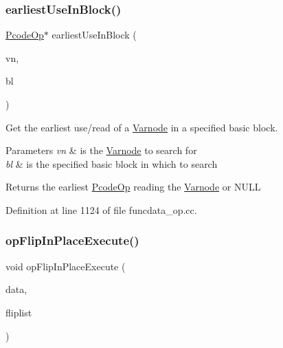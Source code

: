 \subsubsection{\texorpdfstring{earliestUseInBlock()}{earliestUseInBlock()}}
{\footnotesize\ttfamily \mbox{\hyperlink{class_pcode_op}{Pcode\+Op}}$\ast$ earliest\+Use\+In\+Block (\begin{DoxyParamCaption}\item[{\mbox{\hyperlink{class_varnode}{Varnode}} $\ast$}]{vn,  }\item[{\mbox{\hyperlink{class_block_basic}{Block\+Basic}} $\ast$}]{bl }\end{DoxyParamCaption})}



Get the earliest use/read of a \mbox{\hyperlink{class_varnode}{Varnode}} in a specified basic block. 


\begin{DoxyParams}{Parameters}
{\em vn} & is the \mbox{\hyperlink{class_varnode}{Varnode}} to search for \\
\hline
{\em bl} & is the specified basic block in which to search \\
\hline
\end{DoxyParams}
\begin{DoxyReturn}{Returns}
the earliest \mbox{\hyperlink{class_pcode_op}{Pcode\+Op}} reading the \mbox{\hyperlink{class_varnode}{Varnode}} or N\+U\+LL 
\end{DoxyReturn}


Definition at line 1124 of file funcdata\+\_\+op.\+cc.

\mbox{\label{funcdata_8hh_a0a7a4ee0c419ed55c99f44d914284828}} 
\subsubsection{\texorpdfstring{opFlipInPlaceExecute()}{opFlipInPlaceExecute()}}
{\footnotesize\ttfamily void op\+Flip\+In\+Place\+Execute (\begin{DoxyParamCaption}\item[{\mbox{\hyperlink{class_funcdata}{Funcdata}} \&}]{data,  }\item[{vector$<$ \mbox{\hyperlink{class_pcode_op}{Pcode\+Op}} $\ast$ $>$ \&}]{fliplist }\end{DoxyParamCaption})}



